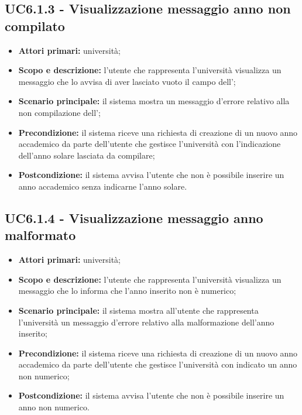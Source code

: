 \documentclass[AnalisiDeiRequisiti.tex]{subfiles}
\begin{document}
\subsection{UC6.1.3 - Visualizzazione messaggio anno non compilato}
\begin{itemize}
	\item \textbf{Attori primari:} università;
	\item \textbf{Scopo e descrizione:} l'utente che rappresenta l'università visualizza un messaggio che lo avvisa di aver lasciato vuoto il campo dell';
	\item \textbf{Scenario principale:} il sistema mostra un messaggio d'errore relativo alla non compilazione dell';
	\item \textbf{Precondizione:} il sistema riceve una richiesta di creazione di un nuovo anno accademico da parte dell'utente che gestisce l'università con l'indicazione dell'anno solare lasciata da compilare; 
	\item \textbf{Postcondizione:} il sistema avvisa l'utente che non è possibile inserire un anno accademico senza indicarne l'anno solare.
\end{itemize}
\subsection{UC6.1.4 - Visualizzazione messaggio anno malformato}
\begin{itemize}
	\item \textbf{Attori primari:} università;
	\item \textbf{Scopo e descrizione:} l'utente che rappresenta l'università visualizza un messaggio che lo informa che l'anno inserito non è numerico;
	\item \textbf{Scenario principale:} il sistema mostra all'utente che rappresenta l'università un messaggio d'errore relativo alla malformazione dell'anno inserito;
	\item \textbf{Precondizione:} il sistema riceve una richiesta di creazione di un nuovo anno accademico da parte dell'utente che gestisce l'università con indicato un anno non numerico; 
	\item \textbf{Postcondizione:} il sistema avvisa l'utente che non è possibile inserire un anno non numerico.
\end{itemize}
\end{document}
